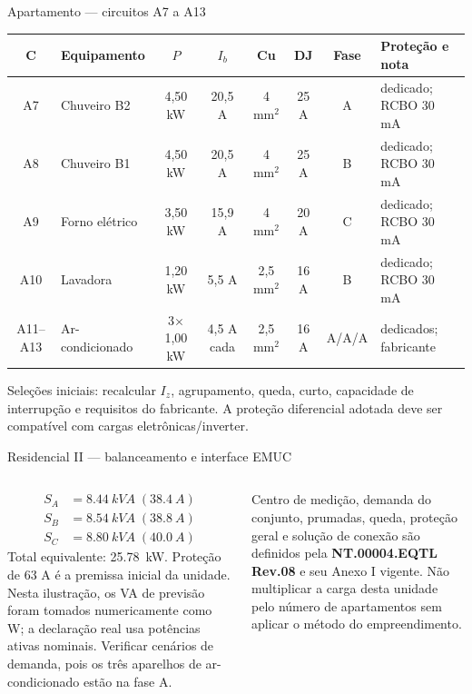 \begin{frame}{Apartamento — circuitos A7 a A13}
\scriptsize
\begin{tabularx}{\textwidth}{c p{2.5cm} c c c c c X}
\toprule
C & Equipamento & $P$ & $I_b$ & Cu & DJ & Fase & Proteção e nota\\
\midrule
A7 & Chuveiro B2 & 4,50 kW & 20,5 A & 4 mm$^2$ & 25 A & A & dedicado; RCBO 30 mA\\
A8 & Chuveiro B1 & 4,50 kW & 20,5 A & 4 mm$^2$ & 25 A & B & dedicado; RCBO 30 mA\\
A9 & Forno elétrico & 3,50 kW & 15,9 A & 4 mm$^2$ & 20 A & C & dedicado; RCBO 30 mA\\
A10 & Lavadora & 1,20 kW & 5,5 A & 2,5 mm$^2$ & 16 A & B & dedicado; RCBO 30 mA\\
A11--A13 & Ar-condicionado & 3$\times$1,00 kW & 4,5 A cada & 2,5 mm$^2$ & 16 A & A/A/A & dedicados; fabricante\\
\bottomrule
\end{tabularx}
\begin{caixaAt}
Seleções iniciais: recalcular $I_z$, agrupamento, queda, curto, capacidade de interrupção e requisitos do fabricante. A proteção diferencial adotada deve ser compatível com cargas eletrônicas/inverter.
\end{caixaAt}
\end{frame}

\begin{frame}{Residencial II — balanceamento e interface EMUC}
\small\begin{columns}[T,onlytextwidth]
\begin{caixaProjeto}[title=Unidade revisada]
\begin{align*}
S_A&=\SI{8.44}{kVA}\;(\SI{38.4}{A})\\
S_B&=\SI{8.54}{kVA}\;(\SI{38.8}{A})\\
S_C&=\SI{8.80}{kVA}\;(\SI{40.0}{A})
\end{align*}
Total equivalente: \SI{25.78}{kW}. Proteção de 63 A é a premissa inicial da unidade. Nesta ilustração, os VA de previsão foram tomados numericamente como W; a declaração real usa potências ativas nominais. Verificar cenários de demanda, pois os três aparelhos de ar-condicionado estão na fase A.
\end{caixaProjeto}
\begin{caixaNorma}[title=Edifício multifamiliar]
Centro de medição, demanda do conjunto, prumadas, queda, proteção geral e solução de conexão são definidos pela \textbf{NT.00004.EQTL Rev.08} e seu Anexo I vigente. Não multiplicar a carga desta unidade pelo número de apartamentos sem aplicar o método do empreendimento.
\end{caixaNorma}
\end{columns}
\end{frame}

